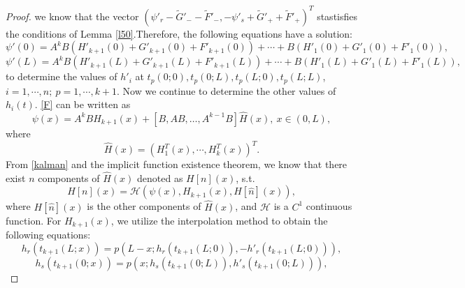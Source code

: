 \documentclass[a4paper,reqno,11pt]{amsart}
\numberwithin{equation}{section} %
\begin{document}
\begin{proof}
we know that the vector $(\psi '_r-\tilde{G}'_--\tilde{F}'_-,-\psi '_s+\tilde{G}'_++\tilde{F}'_+)^T$ stastisfies the conditions of Lemma \ref{l50}.Therefore, the following equations have a solution:
\begin{equation}\label{c1 continuity at 0}
	\psi  '\left( 0 \right)=A^kB(H'_{k+1}\left( 0\right)+G'_{k+1}\left( 0 \right)+F'_{k+1}\left( 0 \right)) +\cdots + B(H'_1\left( 0 \right)+G'_1\left( 0 \right)+F'_1\left( 0 \right)) ,
\end{equation}
\begin{equation}\label{c1 continuity at L}
	\psi  '\left( L \right)=A^kB(H'_{k+1}\left( L \right)+G'_{k+1}\left( L \right)+F'_{k+1}\left( L \right)) +\cdots + B(H'_1\left( L \right)+G'_1\left( L \right)+F'_1\left( L \right)) ,
\end{equation}
to determine the values of $h'_i$ at $t_p(0;0),t_p(0;L),t_p(L;0),t_p(L;L)$,$i=1,\cdots,n;\ p=1,\cdots,k+1$.
Now we continue to determine the other values of $h_i(t)$. \eqref{F} can be written as
\begin{equation}\label{G}
    \psi\left( x \right) =A^kBH_{k+1}\left( x \right) +\left[B, AB, \ldots, A^{k-1} B\right] \hat{H}(x)  ,\ x\in \left( 0,L \right),
\end{equation}
where 
$$
\hat{H}(x)=\left( H^T_1\left( x \right) ,\cdots ,H^T_k\left( x \right) \right)^T .
$$
From \eqref{kalman} and the implicit function existence theorem, we know that there exist $n$ components of $\hat{H}(x)$ denoted as $H[n](x) $, s.t.
\begin{equation}\label{H}
H\left[ n \right] \left( x \right) =\mathcal{H} \left( \psi\left( x \right) ,H_{k+1}\left( x \right) ,H\left[ \hat{n} \right] \left( x \right) \right) ,
\end{equation}
where $H\left[ \hat{n} \right] \left( x \right)$ is the other components of $\hat{H}(x)$, and $\mathcal{H}$ is a $C^1$ continuous function. For $H_{k+1}\left( x \right) $, we utilize the interpolation method to obtain the following equations:
\begin{equation}\label{polynomial k+1 r}
h_r\left( t_{k+1}\left( L;x \right) \right) =p\left( L-x;h_r\left( t_{k+1}\left( L;0 \right) \right) ,-h'_r\left( t_{k+1}\left( L;0 \right) \right) \right) ,
\end{equation}
\begin{equation}\label{polynomial k+1 s}
	h_s\left( t_{k+1}\left( 0;x \right) \right) =p\left( x;h_s\left( t_{k+1}\left( 0;L \right) \right) ,h'_s\left( t_{k+1}\left( 0;L \right) \right) \right) ,
\end{equation}

\end{proof}
\end{document}
